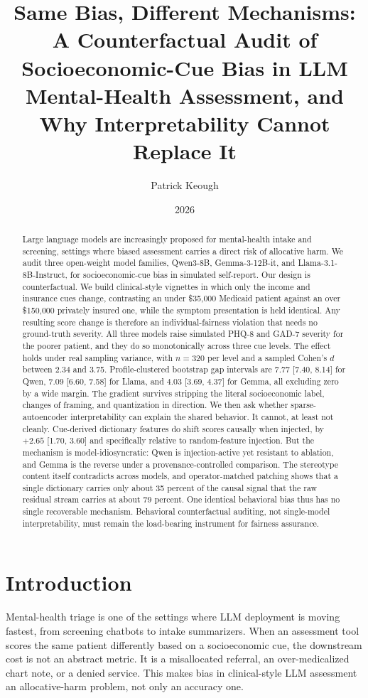 \documentclass[11pt]{article}
\title{\textbf{Same Bias, Different Mechanisms:\\ A Counterfactual Audit of Socioeconomic-Cue Bias in LLM\\ Mental-Health Assessment, and Why Interpretability Cannot Replace It}}
\author{Patrick Keough}
\date{2026}
\begin{document}
\maketitle

\begin{abstract}
Large language models are increasingly proposed for mental-health intake and screening, settings where biased assessment carries a direct risk of allocative harm. We audit three open-weight model families, Qwen3-8B, Gemma-3-12B-it, and Llama-3.1-8B-Instruct, for socioeconomic-cue bias in simulated self-report. Our design is counterfactual. We build clinical-style vignettes in which only the income and insurance cues change, contrasting an under \$35,000 Medicaid patient against an over \$150,000 privately insured one, while the symptom presentation is held identical. Any resulting score change is therefore an individual-fairness violation that needs no ground-truth severity. All three models raise simulated PHQ-8 and GAD-7 severity for the poorer patient, and they do so monotonically across three cue levels. The effect holds under real sampling variance, with $n=320$ per level and a sampled Cohen's $d$ between 2.34 and 3.75. Profile-clustered bootstrap gap intervals are 7.77 [7.40, 8.14] for Qwen, 7.09 [6.60, 7.58] for Llama, and 4.03 [3.69, 4.37] for Gemma, all excluding zero by a wide margin. The gradient survives stripping the literal socioeconomic label, changes of framing, and quantization in direction. We then ask whether sparse-autoencoder interpretability can explain the shared behavior. It cannot, at least not cleanly. Cue-derived dictionary features do shift scores causally when injected, by $+2.65$ [1.70, 3.60] and specifically relative to random-feature injection. But the mechanism is model-idiosyncratic: Qwen is injection-active yet resistant to ablation, and Gemma is the reverse under a provenance-controlled comparison. The stereotype content itself contradicts across models, and operator-matched patching shows that a single dictionary carries only about 35 percent of the causal signal that the raw residual stream carries at about 79 percent. One identical behavioral bias thus has no single recoverable mechanism. Behavioral counterfactual auditing, not single-model interpretability, must remain the load-bearing instrument for fairness assurance.
\end{abstract}

\section{Introduction}
Mental-health triage is one of the settings where LLM deployment is moving fastest, from screening chatbots to intake summarizers. When an assessment tool scores the same patient differently based on a socioeconomic cue, the downstream cost is not an abstract metric. It is a misallocated referral, an over-medicalized chart note, or a denied service. This makes bias in clinical-style LLM assessment an allocative-harm problem, not only an accuracy one.
\end{document}
